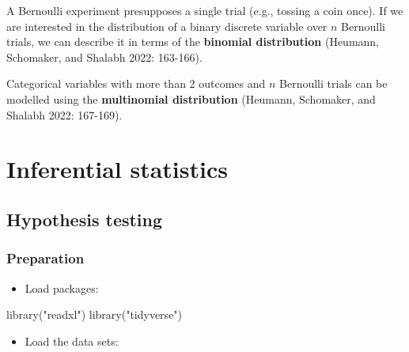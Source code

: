 \documentclass[
  11pt,
  letterpaper,
  DIV=11,
  numbers=noendperiod]{scrreprt}
\newenvironment{Shaded}{\begin{snugshade}}{\end{snugshade}}
\newcommand{\FunctionTok}[1]{\textcolor[rgb]{0.28,0.35,0.67}{#1}}
\newcommand{\NormalTok}[1]{\textcolor[rgb]{0.00,0.23,0.31}{#1}}
\newcommand{\StringTok}[1]{\textcolor[rgb]{0.13,0.47,0.30}{#1}}
\providecommand{\tightlist}{%
  \setlength{\itemsep}{0pt}\setlength{\parskip}{0pt}}\usepackage{longtable,booktabs,array}
\begin{document}
\begin{tcolorbox}[enhanced jigsaw, toprule=.15mm, opacitybacktitle=0.6, coltitle=black, arc=.35mm, colback=white, title=\textcolor{quarto-callout-note-color}{\faInfo}\hspace{0.5em}{Extensions}, titlerule=0mm, toptitle=1mm, bottomtitle=1mm, breakable, rightrule=.15mm, opacityback=0, bottomrule=.15mm, leftrule=.75mm, colframe=quarto-callout-note-color-frame, left=2mm, colbacktitle=quarto-callout-note-color!10!white]

A Bernoulli experiment presupposes a single trial (e.g., tossing a coin
once). If we are interested in the distribution of a binary discrete
variable over \(n\) Bernoulli trials, we can describe it in terms of the
\textbf{binomial distribution} (Heumann, Schomaker, and Shalabh 2022:
163-166).

Categorical variables with more than 2 outcomes and \(n\) Bernoulli
trials can be modelled using the \textbf{multinomial distribution}
(Heumann, Schomaker, and Shalabh 2022: 167-169).

\end{tcolorbox}

\part{Inferential statistics}

\chapter{Hypothesis testing}\label{hypothesis-testing}

\section{Preparation}\label{preparation-5}

\begin{itemize}
\tightlist
\item
  Load packages:
\end{itemize}

\begin{Shaded}
\begin{Highlighting}[]
\FunctionTok{library}\NormalTok{(}\StringTok{"readxl"}\NormalTok{)}
\FunctionTok{library}\NormalTok{(}\StringTok{"tidyverse"}\NormalTok{)}
\end{Highlighting}
\end{Shaded}

\begin{itemize}
\tightlist
\item
  Load the data sets:
\end{itemize}
\end{document}
